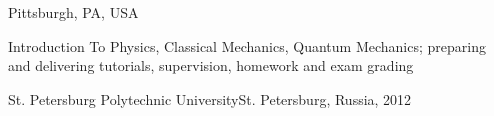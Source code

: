 \documentclass[10pt,a4paper,ragged2e,withhyper]{altacv}
\begin{document}
\begin{paracol}{2}
\divider

{Pittsburgh, PA, USA}

Introduction To Physics, Classical Mechanics, Quantum Mechanics;
preparing and delivering tutorials, supervision, homework and exam grading




\switchcolumn



\divider


\divider

{St. Petersburg Polytechnic University}{St. Petersburg, Russia, 2012}{}





\end{paracol}
\end{document}

